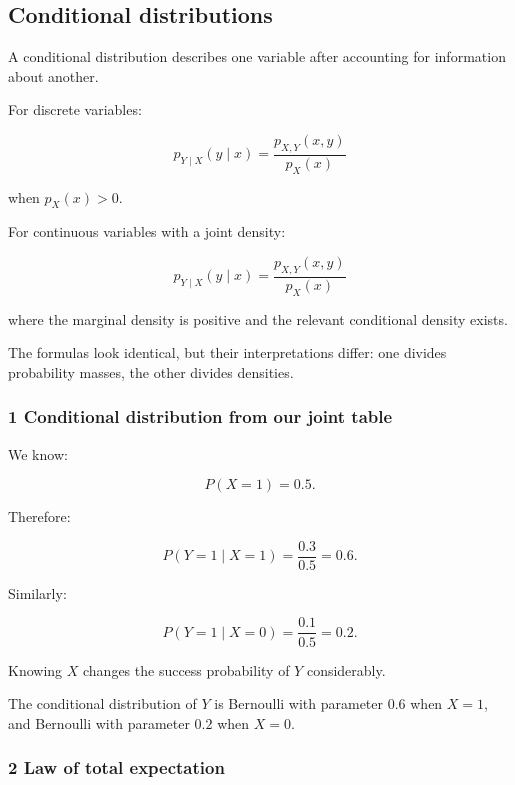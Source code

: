 \subsection{Conditional distributions}\label{02-foundations-ii-ch023-conditional-distributions}

\hypertarget{02-foundations-ii-ch023-conditional-distributions}{}

A conditional distribution describes one variable after accounting for information about another.

For discrete variables:

\[
 \boxed{ p_{Y\mid X}(y\mid x) = \frac{p_{X,Y}(x,y)}{p_X(x)} }
\]

when \(p_X(x)>0\).

For continuous variables with a joint density:

\[
 \boxed{ p_{Y\mid X}(y\mid x) = \frac{p_{X,Y}(x,y)}{p_X(x)} }
\]

where the marginal density is positive and the relevant conditional density exists.

The formulas look identical, but their interpretations differ: one divides probability masses, the other divides densities.

\subsubsection{1 Conditional distribution from our joint table}\label{02-foundations-ii-ch023-conditional-distribution-from-our-joint-table}

\hypertarget{02-foundations-ii-ch023-conditional-distribution-from-our-joint-table}{}

We know:

\[
 P(X=1)=0.5.
\]

Therefore:

\[
 P(Y=1\mid X=1) = \frac{0.3}{0.5} =\boxed{0.6}.
\]

Similarly:

\[
 P(Y=1\mid X=0) = \frac{0.1}{0.5} =\boxed{0.2}.
\]

Knowing \(X\) changes the success probability of \(Y\) considerably.

The conditional distribution of \(Y\) is Bernoulli with parameter \(0.6\) when \(X=1\), and Bernoulli with parameter \(0.2\) when \(X=0\).

\subsubsection{2 Law of total expectation}\label{02-foundations-ii-ch023-law-of-total-expectation}

